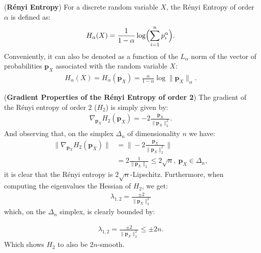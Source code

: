 \begin{definition}
    (\textbf{Rényi Entropy}) For a discrete random variable $X$, the Rényi Entropy of order $\alpha$ is defined as: 
    \[H_\alpha(X) = \frac{1}{1-\alpha} \log \Bigl( \sum^n_{i=1}p_i^\alpha \Bigr). \]
    Conveniently, it can also be denoted as a function of the $L_\alpha$ norm of the vector of probabilities $\bm{p}_X$ associated with the random variable $X$:
    \begin{align*}
        H_\alpha(X)= H_\alpha(\bm{p}_X)= \frac{\alpha}{1- \alpha} \log \|\bm{p}_X \|_\alpha.
    \end{align*}
\end{definition}

\begin{observation}
    (\textbf{Gradient Properties of the Rényi Entropy of order 2})
    The gradient of the Rényi entropy of order $2$ ($H_2$) is simply given by:
    \begin{align*}
        \nabla_{\bm{p}_X} H_2(\bm{p}_X) 
         = -2 \frac{ \bm{p}_X  }{\|\bm{p}_X \|_2^2}.
    \end{align*}
    And observing that, on the simplex $\Delta_n$ of dimensionality $n$ we have:
    \begin{align*}
        \|\nabla_{\bm{p}_X} H_2(\bm{p}_X)\| &= \Bigg\| -2 \frac{ \bm{p}_X  }{\|\bm{p}_X \|_2^2} \Bigg\| \\
        &= 2 \frac{ 1 }{\|  \bm{p}_X  \|_2 } \leq 2 \sqrt{n}, ~ \bm{p}_X \in \Delta_n,
    \end{align*}
    it is clear that the Rényi entropy is $2\sqrt{n}$-Lipschitz. Furthermore, when computing the eigenvalues the Hessian of $H_2$, we get:
    \begin{align*}
        \lambda_{1,2} = \frac{\pm 2}{\|\bm{p}_X \|_2^2}
    \end{align*}
    which, on the $\Delta_n$ simplex, is clearly bounded by:
    
    
    \begin{align*}
        \lambda_{1,2} = \frac{\pm 2}{\|\bm{p}_X \|_2^2} \leq \pm 2 n.
    \end{align*}
    Which shows $H_2$ to also be $2n$-smooth.
\end{observation}
